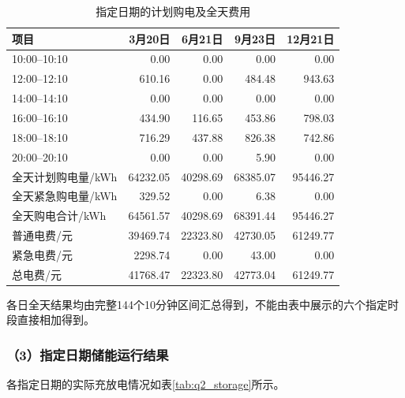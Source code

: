 \begin{table}[H]
\centering
\caption{指定日期的计划购电及全天费用}
\label{tab:q2_specified_purchase}
\begin{tabular}{lrrrr}
\hline
项目 & 3月20日 & 6月21日 & 9月23日 & 12月21日 \\
\hline
10:00--10:10
& 0.00 & 0.00 & 0.00 & 0.00 \\
12:00--12:10
& 610.16 & 0.00 & 484.48 & 943.63 \\
14:00--14:10
& 0.00 & 0.00 & 0.00 & 0.00 \\
16:00--16:10
& 434.90 & 116.65 & 453.86 & 798.03 \\
18:00--18:10
& 716.29 & 437.88 & 826.38 & 742.86 \\
20:00--20:10
& 0.00 & 0.00 & 5.90 & 0.00 \\
全天计划购电量/kWh
& 64232.05 & 40298.69 & 68385.07 & 95446.27 \\
全天紧急购电量/kWh
& 329.52 & 0.00 & 6.38 & 0.00 \\
全天购电合计/kWh
& 64561.57 & 40298.69 & 68391.44 & 95446.27 \\
普通电费/元
& 39469.74 & 22323.80 & 42730.05 & 61249.77 \\
紧急电费/元
& 2298.74 & 0.00 & 43.00 & 0.00 \\
总电费/元
& 41768.47 & 22323.80 & 42773.04 & 61249.77 \\
\hline
\end{tabular}
\end{table}

各日全天结果均由完整144个10分钟区间汇总得到，不能由表中展示的六个指定时段直接相加得到。


\subsubsection*{（3）指定日期储能运行结果}

各指定日期的实际充放电情况如表\ref{tab:q2_storage}所示。

